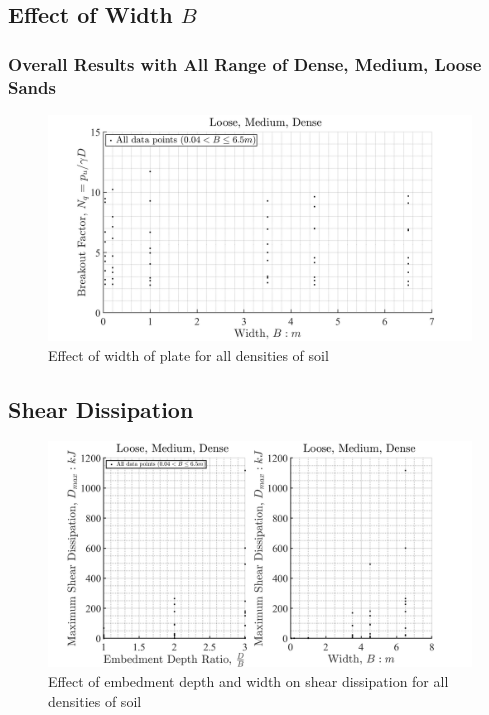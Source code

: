 \documentclass[a4paper, nobind]{templates/ociamthesis}
\begin{document}
\hypertarget{effect-of-width-b}{%
\subsection{\texorpdfstring{Effect of Width \(B\)}{Effect of Width B}}\label{effect-of-width-b}}

\hypertarget{overall-results-with-all-range-of-dense-medium-loose-sands-1}{%
\subsubsection{Overall Results with All Range of Dense, Medium, Loose Sands}\label{overall-results-with-all-range-of-dense-medium-loose-sands-1}}

\begin{figure}[H]
\includegraphics[width=1\linewidth]{myfigureeeeee/width_B} \caption{Effect of width of plate for all densities of soil}\label{fig:unnamed-chunk-23}
\end{figure}

\hypertarget{shear-dissipation}{%
\subsection{Shear Dissipation}\label{shear-dissipation}}

\begin{figure}[H]
\includegraphics[width=1\linewidth]{myfigureeeeee/shear_dissipation_together} \caption{Effect of embedment depth and width on shear dissipation for all densities of soil}\label{fig:unnamed-chunk-24}
\end{figure}
\end{document}
